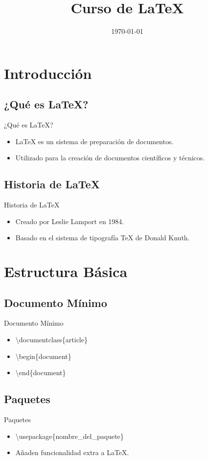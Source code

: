 \documentclass[12]{beamer}
\title{Curso de LaTeX}
\date{\today}
\begin{document}
\frame{\titlepage}

\section{Introducción}
\subsection{¿Qué es LaTeX?}
\begin{frame}{¿Qué es LaTeX?}
  \begin{itemize}
    \item LaTeX es un sistema de preparación de documentos.
    \item Utilizado para la creación de documentos científicos y técnicos.
  \end{itemize}
\end{frame}

\subsection{Historia de LaTeX}
\begin{frame}{Historia de LaTeX}
  \begin{itemize}
    \item Creado por Leslie Lamport en 1984.
    \item Basado en el sistema de tipografía TeX de Donald Knuth.
  \end{itemize}
\end{frame}

\section{Estructura Básica}
\subsection{Documento Mínimo}
\begin{frame}{Documento Mínimo}
  \begin{itemize}
    \item \textbackslash documentclass\{article\}
    \item \textbackslash begin\{document\}
    \item \textbackslash end\{document\}
  \end{itemize}
\end{frame}

\subsection{Paquetes}
\begin{frame}{Paquetes}
  \begin{itemize}
    \item \textbackslash usepackage\{nombre\_del\_paquete\}
    \item Añaden funcionalidad extra a LaTeX.
  \end{itemize}
\end{frame}
\end{document}
